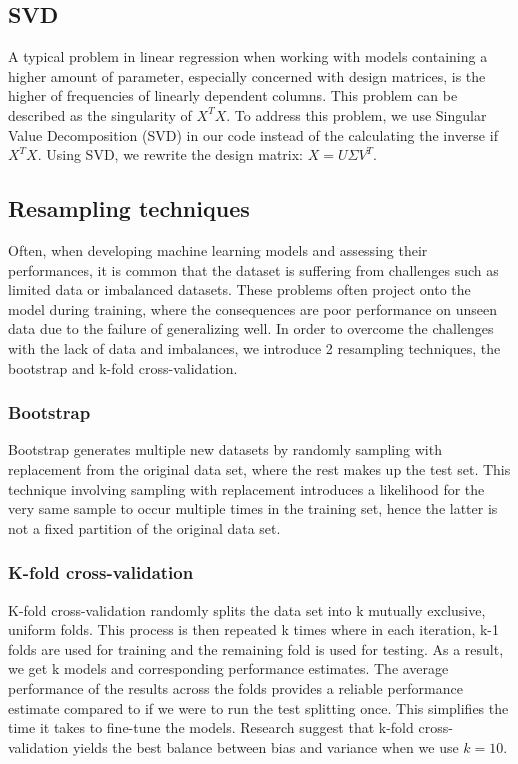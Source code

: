 \documentclass[aps,rmp,reprint,amsmath,amssymb,graphicx,longbibliography]{revtex4-1}
\begin{document}
\subsection{SVD}
A typical problem in linear regression when working with models containing a higher amount of parameter, especially concerned with design matrices, is the higher of frequencies of linearly dependent columns. This problem can be described as the singularity of $X^TX$. To address this problem, we use Singular Value Decomposition (SVD) in our code instead of the calculating the inverse if $X^TX$. 
Using SVD, we rewrite the design matrix: $X=U\Sigma V^T$.

\subsection{Resampling techniques}
Often, when developing machine learning models and assessing their performances, it is common that the dataset is suffering from challenges such as limited data or imbalanced datasets. These problems often project onto the model during training, where the consequences are poor performance on unseen data due to the failure of generalizing well. In order to overcome the challenges with the lack of data and imbalances, we introduce 2 resampling techniques, the bootstrap and k-fold cross-validation.

\subsubsection{Bootstrap}
Bootstrap generates multiple new datasets by randomly sampling with replacement from the original data set, where the rest makes up the test set. This technique involving sampling with replacement introduces a likelihood for the very same sample to occur multiple times in the training set, hence the latter is not a fixed partition of the original data set.

\subsubsection{K-fold cross-validation}
 K-fold cross-validation randomly splits the data set into k mutually exclusive, uniform folds. This process is then repeated k times where in each iteration, k-1 folds are used for training and the remaining fold is used for testing. As a result, we get k models and corresponding performance estimates. 
  The average performance of the results across the folds provides a reliable performance estimate compared to if we were to run the test splitting once\cite{raschka2022}. This simplifies the time it takes to fine-tune the models. Research suggest that k-fold cross-validation yields the best balance between bias and variance when we use $k=10$\cite{crossvalidation}.
\end{document}
